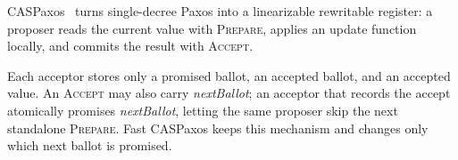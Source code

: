 CASPaxos~\cite{rystsov_caspaxos} turns single-decree Paxos into a linearizable rewritable register: a proposer reads the current value with \textsc{Prepare}, applies an update function locally, and commits the result with \textsc{Accept}.

Each acceptor stores only a promised ballot, an accepted ballot, and an accepted value.
An \textsc{Accept} may also carry \textit{nextBallot}; an acceptor that records the accept atomically promises \textit{nextBallot}, letting the same proposer skip the next standalone \textsc{Prepare}.
Fast CASPaxos keeps this mechanism and changes only which next ballot is promised.


